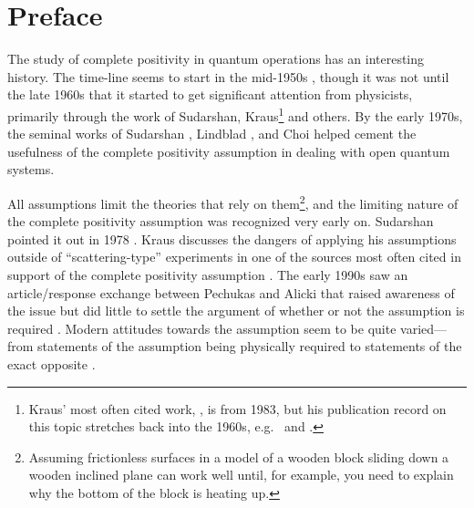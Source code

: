 \newpage
\chapter*{Preface}
The study of complete positivity in quantum operations has an interesting history.  The time-line seems to start in the mid-1950s \cite{Stinespring1955}, though it was not until the late 1960s that it started to get significant attention from physicists, primarily through the work of Sudarshan, Kraus\footnote{Kraus' most often cited work, \cite{Kraus1983}, is from 1983, but his publication record on this topic stretches back into the 1960s, e.g.\ \cite{Kraus1971} and \cite{Kraus1969}.} and others.  By the early 1970s, the seminal works of Sudarshan \cite{Sudarshan1976}, Lindblad \cite{Lindblad1976}, and Choi \cite{Choi1975} helped cement the usefulness of the complete positivity assumption in dealing with open quantum systems.  

All assumptions limit the theories that rely on them\footnote{Assuming frictionless surfaces in a model of a wooden block sliding down a wooden inclined plane can work well until, for example, you need to explain why the bottom of the block is heating up.}, and the limiting nature of the complete positivity assumption was recognized very early on.  Sudarshan pointed it out in 1978 \cite{Sudarshan1978}.  Kraus discusses the dangers of applying his assumptions outside of ``scattering-type'' experiments in one of the sources most often cited in support of the complete positivity assumption \cite{Kraus1983}.  The early 1990s saw an article/response exchange between Pechukas and Alicki that raised awareness of the issue but did little to settle the argument of whether or not the assumption is required \cite{Pechukas1994,Alicki1995,Pechukas1995}.  Modern attitudes towards the assumption seem to be quite varied---from statements of the assumption being physically required \cite{Benatti2005,Alicki2001} to statements of the exact opposite \cite{Sudarshan2005}. 

